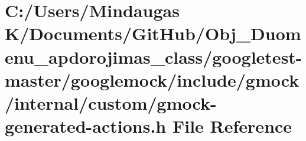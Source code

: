 \hypertarget{googletest-master_2googlemock_2include_2gmock_2internal_2custom_2gmock-generated-actions_8h}{}\section{C\+:/\+Users/\+Mindaugas K/\+Documents/\+Git\+Hub/\+Obj\+\_\+\+Duomenu\+\_\+apdorojimas\+\_\+class/googletest-\/master/googlemock/include/gmock/internal/custom/gmock-\/generated-\/actions.h File Reference}
\label{googletest-master_2googlemock_2include_2gmock_2internal_2custom_2gmock-generated-actions_8h}
